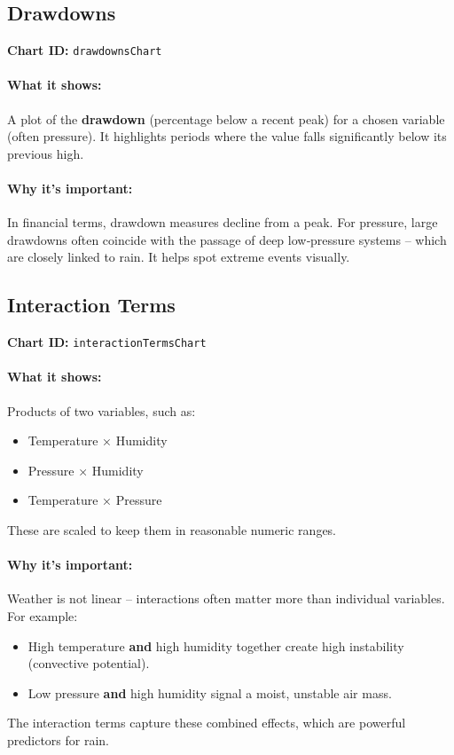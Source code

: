 \documentclass[11pt,a4paper]{article}
\begin{document}
	\subsection{Drawdowns}
	\textbf{Chart ID:} \texttt{drawdownsChart}
	
	\paragraph{What it shows:}
	A plot of the \textbf{drawdown} (percentage below a recent peak) for a chosen variable (often pressure). It highlights periods where the value falls significantly below its previous high.
	
	\paragraph{Why it’s important:}
	In financial terms, drawdown measures decline from a peak. For pressure, large drawdowns often coincide with the passage of deep low‑pressure systems – which are closely linked to rain. It helps spot extreme events visually.
	
	\subsection{Interaction Terms}
	\textbf{Chart ID:} \texttt{interactionTermsChart}
	
	\paragraph{What it shows:}
	Products of two variables, such as:
	\begin{itemize}
		\item Temperature × Humidity
		\item Pressure × Humidity
		\item Temperature × Pressure
	\end{itemize}
	These are scaled to keep them in reasonable numeric ranges.
	
	\paragraph{Why it’s important:}
	Weather is not linear – interactions often matter more than individual variables. For example:
	\begin{itemize}
		\item High temperature \textbf{and} high humidity together create high instability (convective potential).
		\item Low pressure \textbf{and} high humidity signal a moist, unstable air mass.
	\end{itemize}
	The interaction terms capture these combined effects, which are powerful predictors for rain.
	
\end{document}
